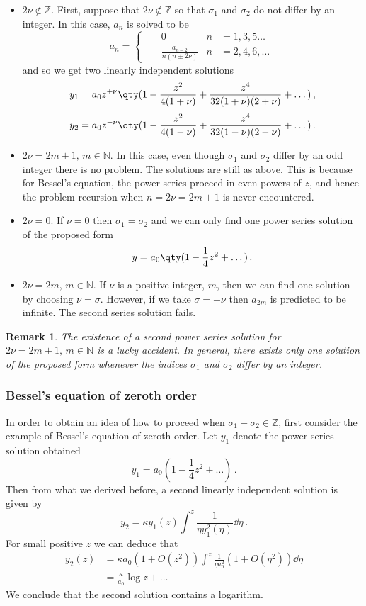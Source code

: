 \documentclass{article}
\theoremstyle{plain}\theoremheaderfont{\normalfont\itshape}\theorembodyfont{\rmfamily}\theoremseparator{.}\newtheorem*{rem}{Remark}\newtheorem*{ex}{Example}\newtheorem*{proof}{Proof}\newtheorem*{altp}{Alternative proof}
\theoremstyle{plain}\theoremheaderfont{\normalfont\bfseries}\theorembodyfont{\rmfamily}\theoremseparator{.}\newtheorem{thm}{Theorem}[section]\newtheorem{lem}[thm]{Lemma}\newtheorem{prop}[thm]{Proposition}\newtheorem*{cor}{Corollary}\newtheorem{defn}[thm]{Definition}\newtheorem{clm}[thm]{Claim}\newtheorem{clminproof}{Claim}
\theoremstyle{break}\theoremheaderfont{\normalfont\itshape}\theorembodyfont{\rmfamily}\theoremseparator{.\medskip}\newtheorem*{proofskip}{Proof}\newtheorem*{exs}{Examples}\newtheorem*{rems}{Remarks}
\theoremstyle{break}\theoremheaderfont{\normalfont\bfseries}\theorembodyfont{\rmfamily}\theoremseparator{.\medskip}\newtheorem{lemskip}[thm]{Lemma}\newtheorem{defnskip}[thm]{Definition}\newtheorem{propskip}[thm]{Proposition}\newtheorem{thmskip}[thm]{Theorem}
\numberwithin{equation}{section}
\begin{document}
	\begin{itemize}
		\item \(2\nu\notin\mathbb{Z}\). First, suppose that \(2\nu\notin\mathbb{Z}\) so that \(\sigma_1\) and \(\sigma_2\) do not differ by an integer. In this case, \(a_n\) is solved to be
		\[a_n=\left\{\begin{aligned}
			&0 &n&=1,3,5\dots\,\\
			-&\frac{a_{n-2}}{n(n\pm 2\nu)} &n&=2,4,6,\dots\,
		\end{aligned}\right.\]
		and so we get two linearly independent solutions
		\[y_1=a_0z^{+\nu}\qty(1-\frac{z^2}{4(1+\nu)}+\frac{z^4}{32(1+\nu)(2+\nu)}+\dots)\,,\]
		\[y_2=a_0z^{-\nu}\qty(1-\frac{z^2}{4(1-\nu)}+\frac{z^4}{32(1-\nu)(2-\nu)}+\dots)\,.\]
	
		\item \(2\nu=2m+1,\,m\in\mathbb{N}\). In this case, even though \(\sigma_1\) and \(\sigma_2\) differ by an odd integer there is no problem. The solutions are still as above. This is because for Bessel's equation, the power series proceed in even powers of \(z\), and hence the problem recursion when \(n=2\nu=2m+1\) is never encountered.
		
		\item \(2\nu=0\). If \(\nu=0\) then \(\sigma_1=\sigma_2\) and we can only find one power series solution of the proposed form
		\[y=a_0\qty(1-\frac{1}{4}z^2+\dots)\,.\]

		\item \(2\nu=2m,\,m\in\mathbb{N}\). If \(\nu\) is a positive integer, \(m\), then we can find one solution by choosing \(\nu=\sigma\). However, if we take \(\sigma=-\nu\) then \(a_{2m}\) is predicted to be infinite. The second series solution fails.
	\end{itemize}
	\begin{rem}
		The existence of a second power series solution for \(2\nu=2m+1,\,m\in\mathbb{N}\) is a lucky accident. In general, there exists only one solution of the proposed form whenever the indices \(\sigma_1\) and \(\sigma_2\) differ by an integer.
	\end{rem}
	\subsubsection*{Bessel's equation of zeroth order}
	In order to obtain an idea of how to proceed when \(\sigma_1-\sigma_2\in\mathbb{Z}\), first consider the example of Bessel's equation of zeroth order. Let \(y_1\) denote the power series solution obtained
	\[y_1=a_0\left(1-\frac{1}{4}z^2+\dots\right)\,.\]
	Then from what we derived before, a second linearly independent solution is given by
	\[y_2=\kappa y_1(z)\int^z \frac{1}{\eta y_1^2(\eta)}\dd{\eta}\,.\]
	For small positive \(z\) we can deduce that
	\begin{align*}
		y_2(z)&=\kappa a_0(1+O(z^2))\int^z \frac{1}{\eta a_0^2}(1+O(\eta^2))\dd{\eta}\\
		&=\frac{\kappa}{a_0}\log z+\dots
	\end{align*}
	We conclude that the second solution contains a logarithm.
\end{document}
